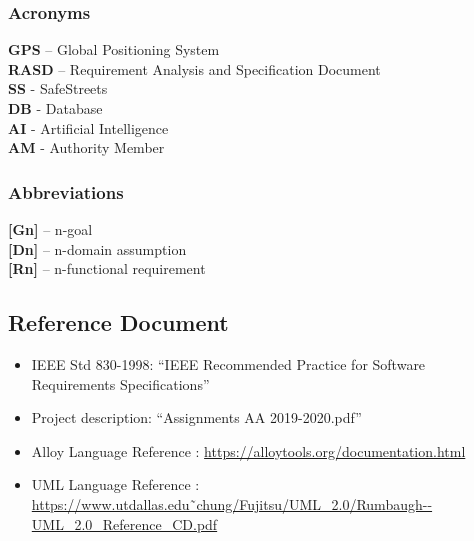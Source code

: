 \documentclass[12pt]{article}
\begin{document}
\subsubsection{Acronyms}
\vspace{2mm}
\begin{flushleft}

\textbf{GPS} – Global Positioning System
\vspace{2mm}\\

\textbf{RASD} – Requirement Analysis and Specification Document 
\vspace{2mm}\\


\textbf{SS} - SafeStreets
\vspace{2mm}\\


\textbf{DB} - Database
\vspace{2mm}\\


\textbf{AI} - Artificial Intelligence
\vspace{2mm}\\

\textbf{AM} - Authority Member
\end{flushleft}

\newpage

\subsubsection{Abbreviations}
\vspace{2mm}
\begin{flushleft}

\textbf{[Gn]} – n-goal 
\vspace{2mm}\\
\textbf{[Dn]} – n-domain assumption 
\vspace{2mm}\\
\textbf{[Rn]} – n-functional requirement 
\vspace{2mm}\\

\end{flushleft}
\vspace{2mm}
\subsection{Reference Document}
\vspace{2mm}
\begin{itemize}
\item IEEE Std 830-1998: “IEEE Recommended Practice for Software Requirements Specifications”

\item Project description: “Assignments AA 2019-2020.pdf”
\item Alloy Language Reference : \url{https://alloytools.org/documentation.html}
\item UML Language Reference : \url{https://www.utdallas.edu˜chung/Fujitsu/UML_2.0/Rumbaugh--UML_2.0_Reference_CD.pdf}
\end{itemize}
\end{document}
